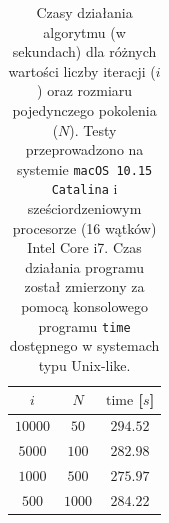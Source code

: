 \begin{table}[!htb]
    \centering
    \begin{tabular}{|c|c|c|}
        \hline
        $i$ & $N$ & $\mathrm{time}$ [$s$]  \\
        \hline
        $10000$ & $50$ & $294.52$ \\
        \hline
        $5000$ & $100$ & $282.98$ \\
        \hline
        $1000$ & $500$ & $275.97$ \\
        \hline
        $500$ & $1000$ & $284.22$ \\
        \hline
    \end{tabular}
    \caption{Czasy działania algorytmu (w sekundach) dla różnych wartości liczby iteracji ($i$) oraz rozmiaru pojedynczego pokolenia ($N$). Testy przeprowadzono na systemie \texttt{macOS 10.15 Catalina} i sześciordzeniowym procesorze (16 wątków) Intel Core i7. Czas działania programu został zmierzony za pomocą konsolowego programu \texttt{time} dostępnego w systemach typu Unix-like.}
    \label{tab:dependence_times}
\end{table}


